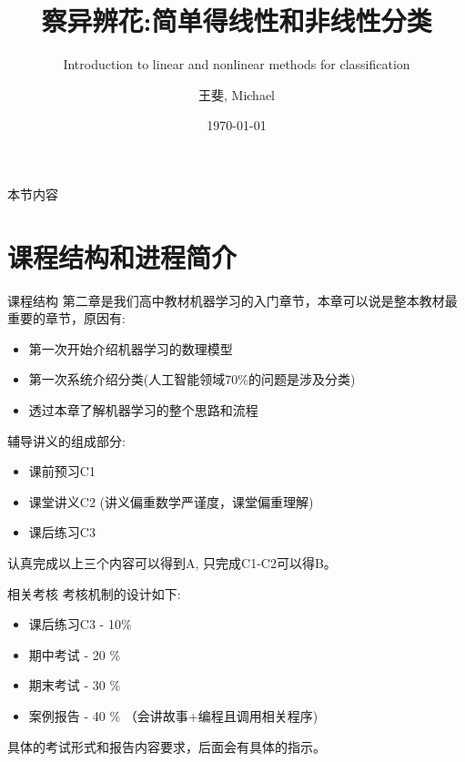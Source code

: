 \documentclass[handout]{beamer}
\title[]{察异辨花:简单得线性和非线性分类}
\subtitle{Introduction to linear and nonlinear methods for classification}
\date{\today}
\author[王斐]{王斐, Michael}
\institute[SenseTime, Edu]{SenseTime Edu \and Math, Economics, Philosophy \and \url{https://github.com/Michael-yunfei/MDLforBeginners}}
\begin{document}



\begin{frame}[noframenumbering]
  \titlepage
\end{frame}



\begin{frame}{本节内容}
	\tableofcontents
\end{frame}

\section{课程结构和进程简介}

\begin{frame}{课程结构}
第二章是我们高中教材机器学习的入门章节，本章可以说是整本教材最重要的章节，原因有:
\begin{itemize}
\setlength\itemsep{1em}
	\item 第一次开始介绍机器学习的数理模型
	\item 第一次系统介绍分类(人工智能领域70\%的问题是涉及分类)
	\item 透过本章了解机器学习的整个思路和流程
\end{itemize}

\hfil

辅导讲义的组成部分:
\begin{itemize}
\setlength\itemsep{1em}
	\item 课前预习C1 
	\item 课堂讲义C2 (讲义偏重数学严谨度，课堂偏重理解)
	\item 课后练习C3
\end{itemize}

\hfil 

认真完成以上三个内容可以得到A, 只完成C1-C2可以得B。
\end{frame}

\begin{frame}{相关考核}
	考核机制的设计如下:
	
	\hfil
	
	\begin{itemize}
	\setlength\itemsep{1em}
		\item 课后练习C3 - 10\% 
		\item 期中考试 - 20 \% 
		\item 期末考试 - 30 \%
		\item 案例报告 - 40 \% （会讲故事+编程且调用相关程序)
	\end{itemize}
	
	\hfil 
	
	具体的考试形式和报告内容要求，后面会有具体的指示。
\end{frame}
\end{document}
